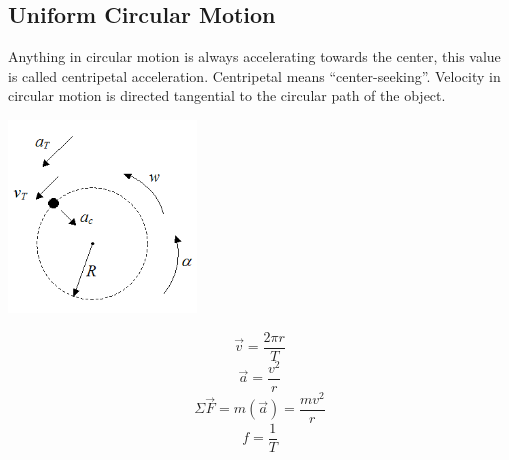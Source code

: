 \documentclass{article}
\begin{document}
  	\subsection{Uniform Circular Motion}
  		Anything in circular motion is always accelerating towards the center, this value is called centripetal acceleration. Centripetal means ``center-seeking''. Velocity in circular motion is directed tangential to the circular path of the object.
  		\begin{multicols}{2}
        	\centerline{\includegraphics[width=5cm]{circularMotion.png}}
            \columnbreak
  			\[
            	\vec{v}=\frac{2\pi r}{T}
            \]
  			\[
            	\vec{a}=\frac{v^2}{r}
            \]
  			\[
            	\Sigma\vec{F}=m(\vec{a})=\frac{mv^2}{r}
            \]
            \[
            	f=\frac{1}{T}
            \]
      	\end{multicols}
        
\end{document}
